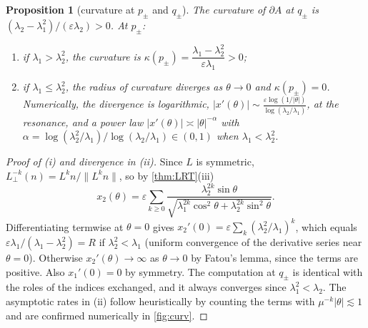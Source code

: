 \documentclass[11pt,a4paper]{article}
\newtheorem{proposition}[theorem]{Proposition}
\theoremstyle{definition}
\theoremstyle{remark}
\newcommand{\eps}{\varepsilon}
\newcommand{\Lperp}{L_\perp}
\begin{document}
\begin{proposition}[curvature at $p_\pm$ and $q_\pm$]\label{prop:curvature}
The curvature of $\partial A$ at $q_\pm$ is $(\lambda_2-\lambda_1^2)/(\eps\lambda_2)>0$. At $p_\pm$:
\begin{enumerate}[label=(\roman*)]
  \item if $\lambda_1>\lambda_2^2$, the curvature is $\kappa(p_\pm)=\dfrac{\lambda_1-\lambda_2^2}{\eps\lambda_1}>0$;
  \item if $\lambda_1\le\lambda_2^2$, the radius of curvature diverges as $\theta\to0$ and $\kappa(p_\pm)=0$. Numerically, the
  divergence is logarithmic, $|x'(\theta)|\sim\frac{\eps\log(1/|\theta|)}{\log(\lambda_2/\lambda_1)}$, at the resonance, and a
  power law $|x'(\theta)|\asymp|\theta|^{-\alpha}$ with $\alpha=\log(\lambda_2^2/\lambda_1)/\log(\lambda_2/\lambda_1)\in(0,1)$ when
  $\lambda_1<\lambda_2^2$.
\end{enumerate}
\end{proposition}
\begin{proof}[Proof of (i) and divergence in (ii)]
Since $L$ is symmetric, $\Lperp^{-k}(n)=L^kn/\|L^kn\|$, so by \cref{thm:LRT}(iii)
\[
  x_2(\theta)=\eps\sum_{k\ge0}\frac{\lambda_2^{2k}\sin\theta}{\sqrt{\lambda_1^{2k}\cos^2\theta+\lambda_2^{2k}\sin^2\theta}} .
\]
Differentiating termwise at $\theta=0$ gives $x_2'(0)=\eps\sum_k(\lambda_2^2/\lambda_1)^k$, which equals
$\eps\lambda_1/(\lambda_1-\lambda_2^2)=R$ if $\lambda_2^2<\lambda_1$ (uniform convergence of the derivative series near $\theta=0$).
Otherwise $x_2'(\theta)\to\infty$ as $\theta\to0$ by Fatou's lemma, since the terms are positive. Also $x_1'(0)=0$ by symmetry. The computation at $q_\pm$ is identical with the roles of the indices exchanged, and it always
converges since $\lambda_1^2<\lambda_2$. The asymptotic rates in (ii) follow heuristically by counting the terms with
$\mu^{-k}|\theta|\lesssim1$ and are confirmed numerically in \cref{fig:curv}.
\end{proof}
\end{document}
